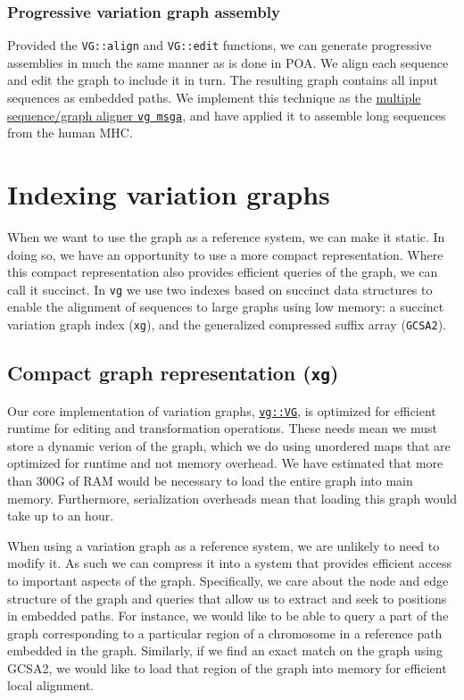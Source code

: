 \documentclass{article}
\begin{document}
\subsubsection{Progressive variation graph assembly}

Provided the {\tt VG::align} and {\tt VG::edit} functions, we can generate progressive assemblies in much the same manner as is done in POA.
We align each sequence and edit the graph to include it in turn.
The resulting graph contains all input sequences as embedded paths.
We implement this technique as the \href{https://github.com/vgteam/vg/blob/fbcb6e62/src/main.cpp#L674-L1248}{multiple sequence/graph aligner {\tt vg msga}}, and have applied it to assemble long sequences from the human MHC.


\section{Indexing variation graphs}

When we want to use the graph as a reference system, we can make it static.
In doing so, we have an opportunity to use a more compact representation.
Where this compact representation also provides efficient queries of the graph, we can call it succinct.
In {\tt vg} we use two indexes based on succinct data structures to enable the alignment of sequences to large graphs using low memory: a succinct variation graph index ({\tt xg}), and the generalized compressed suffix array ({\tt GCSA2}).

\subsection{Compact graph representation ({\tt xg})}

Our core implementation of variation graphs, \href{https://github.com/vgteam/vg/blob/fbcb6e62/src/vg.hpp#L196-L1146}{{\tt vg::VG}}, is optimized for efficient runtime for editing and transformation operations.
These needs mean we must store a dynamic verion of the graph, which we do using unordered maps that are optimized for runtime and not memory overhead.
We have estimated that more than 300G of RAM would be necessary to load the entire graph into main memory.
Furthermore, serialization overheads mean that loading this graph would take up to an hour.

When using a variation graph as a reference system, we are unlikely to need to modify it.
As such we can compress it into a system that provides efficient access to important aspects of the graph.
Specifically, we care about the node and edge structure of the graph and queries that allow us to extract and seek to positions in embedded paths.
For instance, we would like to be able to query a part of the graph corresponding to a particular region of a chromosome in a reference path embedded in the graph.
Similarly, if we find an exact match on the graph using GCSA2, we would like to load that region of the graph into memory for efficient local alignment.
\end{document}
